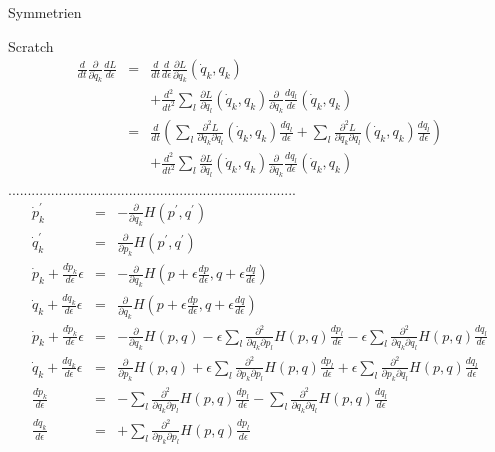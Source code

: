 \documentclass[a4paper,fleqn]{article}
\numberwithin{equation}{section}
\begin{document}
\begin{section}{Symmetrien}
\begin{subsection}{Scratch}
\begin{eqnarray*}
\frac{d}{dt}\frac{\partial}{\partial \dot{q}_k}\frac{dL}{d\epsilon}
&=&\frac{d}{dt}\frac{d}{d\epsilon}\frac{\partial L}{\partial \dot{q}_k}(\dot{q}_k,q_k)\\
&&+\frac{d^2}{dt^2}\sum_l\frac{\partial L}{\partial \dot{q}_l}(\dot{q}_k,q_k)\frac{\partial}{\partial \dot{q}_k}\frac{dq_l}{d\epsilon}(\dot{q}_k,q_k)\\
&=&\frac{d}{dt}\left(\sum_l\frac{\partial^2 L}{\partial \dot{q}_k\partial \dot{q}_l}(\dot{q}_k,q_k)\frac{d\dot{q}_l}{d\epsilon}
+\sum_l\frac{\partial^2 L}{\partial \dot{q}_k\partial q_l}(\dot{q}_k,q_k)\frac{dq_l}{d\epsilon}\right)\\
&&+\frac{d^2}{dt^2}\sum_l\frac{\partial L}{\partial \dot{q}_l}(\dot{q}_k,q_k)\frac{\partial}{\partial \dot{q}_k}\frac{dq_l}{d\epsilon}(\dot{q}_k,q_k)
\end{eqnarray*}
..........................................................................
\begin{eqnarray*}
\dot{p}^\prime_k &=& -\frac{\partial}{\partial q_k}H(p^\prime,q^\prime)\\
\dot{q}^\prime_k &=& \frac{\partial}{\partial p_k}H(p^\prime,q^\prime)\\
\dot{p}_k+\frac{d\dot{p}_k}{d\epsilon}\epsilon &=& -\frac{\partial}{\partial q_k}H\left(p+\epsilon\frac{dp}{d\epsilon},q+\epsilon\frac{dq}{d\epsilon}\right)\\
\dot{q}_k+\frac{d\dot{q}_k}{d\epsilon}\epsilon &=& \frac{\partial}{\partial q_k}H\left(p+\epsilon\frac{dp}{d\epsilon},q+\epsilon\frac{dq}{d\epsilon}\right)\\
\dot{p}_k+\frac{d\dot{p}_k}{d\epsilon}\epsilon &=& -\frac{\partial}{\partial q_k}H\left(p,q\right)
-\epsilon\sum_l\frac{\partial^2}{\partial q_k\partial p_l}H\left(p,q\right)\frac{dp_l}{d\epsilon}
-\epsilon\sum_l\frac{\partial^2}{\partial q_k\partial q_l}H\left(p,q\right)\frac{dq_l}{d\epsilon}\\
\dot{q}_k+\frac{d\dot{q}_k}{d\epsilon}\epsilon &=& \frac{\partial}{\partial p_k}H\left(p,q\right)
+\epsilon\sum_l\frac{\partial^2}{\partial p_k\partial p_l}H\left(p,q\right)\frac{dp_l}{d\epsilon}
+\epsilon\sum_l\frac{\partial^2}{\partial p_k\partial q_l}H\left(p,q\right)\frac{dq_l}{d\epsilon}\\
\frac{d\dot{p}_k}{d\epsilon} &=& 
-\sum_l\frac{\partial^2}{\partial q_k\partial p_l}H\left(p,q\right)\frac{dp_l}{d\epsilon}
-\sum_l\frac{\partial^2}{\partial q_k\partial q_l}H\left(p,q\right)\frac{dq_l}{d\epsilon}\\
\frac{d\dot{q}_k}{d\epsilon} &=& 
+\sum_l\frac{\partial^2}{\partial p_k\partial p_l}H\left(p,q\right)\frac{dp_l}{d\epsilon}

\end{eqnarray*}
\end{subsection}
\end{section}
\end{document}
